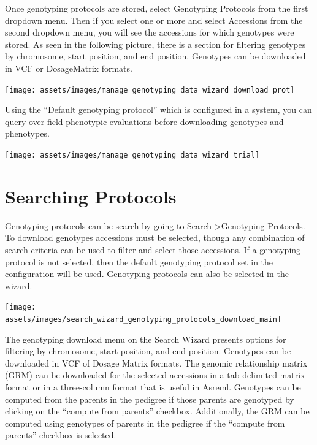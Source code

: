 \documentclass[
  12pt,
]{book}
\begin{document}
Once genotyping protocols are stored, select Genotyping Protocols from the first dropdown menu. Then if you select one or more and select Accessions from the second dropdown menu, you will see the accessions for which genotypes were stored. As seen in the following picture, there is a section for filtering genotypes by chromosome, start position, and end position. Genotypes can be downloaded in VCF or DosageMatrix formats.

\begin{center}\texttt{[image: assets/images/manage\_genotyping\_data\_wizard\_download\_prot]} \end{center}

Using the ``Default genotyping protocol'' which is configured in a system, you can query over field phenotypic evaluations before downloading genotypes and phenotypes.

\begin{center}\texttt{[image: assets/images/manage\_genotyping\_data\_wizard\_trial]} \end{center}

\hypertarget{searching-protocols}{%
\section{Searching Protocols}\label{searching-protocols}}

Genotyping protocols can be search by going to Search-\textgreater Genotyping Protocols. To download genotypes accessions must be selected, though any combination of search criteria can be used to filter and select those accessions. If a genotyping protocol is not selected, then the default genotyping protocol set in the configuration will be used. Genotyping protocols can also be selected in the wizard.

\begin{center}\texttt{[image: assets/images/search\_wizard\_genotyping\_protocols\_download\_main]} \end{center}

The genotyping download menu on the Search Wizard presents options for filtering by chromosome, start position, and end position. Genotypes can be downloaded in VCF of Dosage Matrix formats. The genomic relationship matrix (GRM) can be downloaded for the selected accessions in a tab-delimited matrix format or in a three-column format that is useful in Asreml. Genotypes can be computed from the parents in the pedigree if those parents are genotyped by clicking on the ``compute from parents'' checkbox. Additionally, the GRM can be computed using genotypes of parents in the pedigree if the ``compute from parents'' checkbox is selected.
\end{document}
